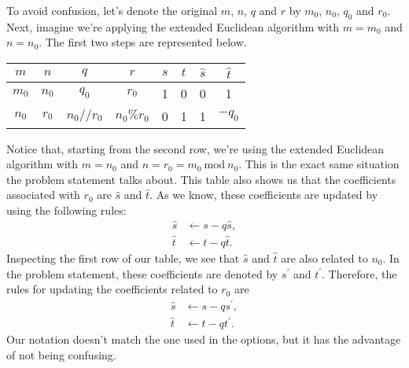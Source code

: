 \documentclass[11pt]{article}
\newcommand{\Mod}[1]{\:\mathrm{mod}\:#1}
\begin{document}
To avoid confusion, let's denote the original \(m\), \(n\), \(q\) and \(r\) by \(m_0\),
\(n_0\), \(q_0\) and \(r_0\). Next, imagine we're applying the extended Euclidean
algorithm with \(m=m_0\) and \(n=n_0\). The first two steps are represented below.
\begin{center}
\begin{tabular}{|c|c|c|c|c|c|c|c|}
\hline
\(m\) & \(n\) & \(q\) & \(r\) & \(s\) & \(t\) & \(\hat{s}\) & \(\hat{t}\)\\[0pt]
\hline
\(m_0\) & \(n_0\) & \(q_0\) & \(r_0\) & 1 & 0 & 0 & 1\\[0pt]
\(n_0\) & \(r_0\) & \(n_0//r_0\) & \(n_0\%r_0\) & 0 & 1 & 1 & \(-q_0\)\\[0pt]
\hline
\end{tabular}
\end{center}
Notice that, starting from the second row, we're using the extended Euclidean
algorithm with \(m=n_0\) and \(n=r_0=m_0\Mod n_0\). This is the exact same situation
the problem statement talks about. This table also shows us that the
coefficients associated with \(r_0\) are \(\hat{s}\) and \(\hat{t}\). As we know,
these coefficients are updated by using the following rules:
\begin{align}
\hat{s}&\leftarrow s-q\hat{s},\\
\hat{t}&\leftarrow t-q\hat{t}.
\end{align}
Inspecting the first row of our table, we see that \(\hat{s}\) and \(\hat{t}\) are
also related to \(n_0\). In the problem statement, these coefficients are denoted
by \(s^{\prime}\) and \(t^{\prime}\). Therefore, the rules for updating the
coefficients related to \(r_0\) are
\begin{align}
\hat{s}&\leftarrow s-qs^{\prime},\\
\hat{t}&\leftarrow t-qt^{\prime}.
\end{align}
Our notation doesn't match the one used in the options, but it has the advantage
of not being confusing.
\end{document}
